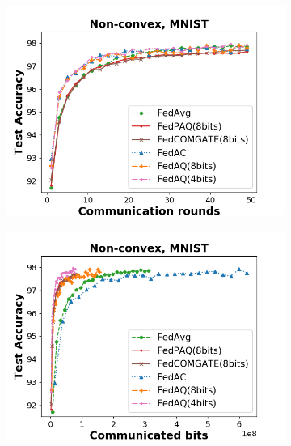 \begin{figure}[hbt!]
    \setcounter{subfigure}{0}
    \begin{subfigure}[b]{0.31\textwidth}
    \includegraphics[width=\textwidth]{figure/accuracy_iid_comm_localstep_100_2.png}
    \end{subfigure}
    \begin{subfigure}[b]{0.31\textwidth}
    \includegraphics[width=\textwidth]{figure/accuracy_iid_bits_localstep_100_2.png}
    \end{subfigure}
    \begin{subfigure}[b]{0.31\textwidth}

\end{subfigure}
\end{figure}
